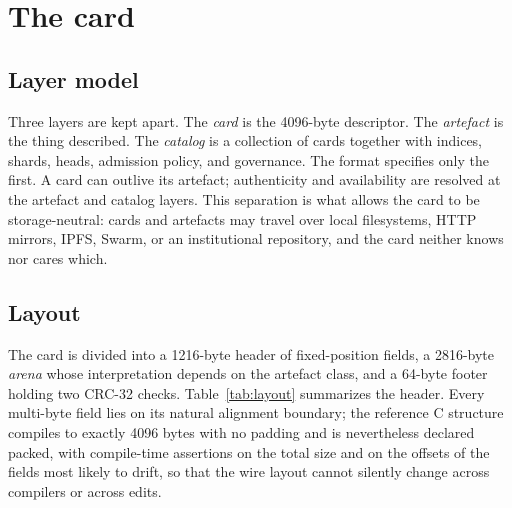 \documentclass[11pt]{article}
\begin{document}
\section{The card}
\label{sec:card}

\subsection{Layer model}

Three layers are kept apart. The \emph{card} is the 4096-byte descriptor. The
\emph{artefact} is the thing described. The \emph{catalog} is a collection of
cards together with indices, shards, heads, admission policy, and governance.
The format specifies only the first. A card can outlive its artefact;
authenticity and availability are resolved at the artefact and catalog layers.
This separation is what allows the card to be storage-neutral: cards and
artefacts may travel over local filesystems, HTTP mirrors, IPFS, Swarm, or an
institutional repository, and the card neither knows nor cares which.

\subsection{Layout}

The card is divided into a 1216-byte header of fixed-position fields, a
2816-byte \emph{arena} whose interpretation depends on the artefact class, and a
64-byte footer holding two CRC-32 checks. Table~\ref{tab:layout} summarizes the
header. Every multi-byte field lies on its natural alignment boundary; the
reference C structure compiles to exactly 4096 bytes with no padding and is
nevertheless declared packed, with compile-time assertions on the total size
and on the offsets of the fields most likely to drift, so that the wire layout
cannot silently change across compilers or across edits.
\end{document}
